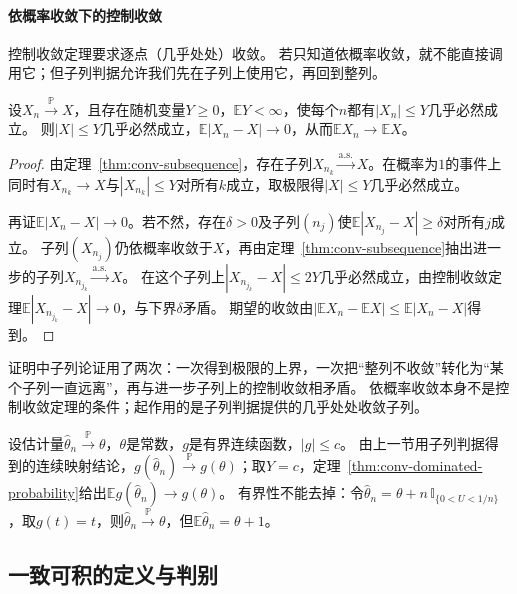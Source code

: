 \paragraph{依概率收敛下的控制收敛}
控制收敛定理要求逐点（几乎处处）收敛。
若只知道依概率收敛，就不能直接调用它；但子列判据允许我们先在子列上使用它，再回到整列。

\begin{theorem}[依概率收敛下的控制收敛]
\label{thm:conv-dominated-probability}
设$X_n\xrightarrow{\mathbb P}X$，且存在随机变量$Y\geq0$，$\mathbb EY<\infty$，使每个$n$都有$|X_n|\leq Y$几乎必然成立。
则$|X|\leq Y$几乎必然成立，$\mathbb E|X_n-X|\to0$，从而$\mathbb EX_n\to\mathbb EX$。
\end{theorem}

\begin{proof}
由定理~\ref{thm:conv-subsequence}，存在子列$X_{n_k}\xrightarrow{\mathrm{a.s.}}X$。在概率为$1$的事件上同时有$X_{n_k}\to X$与$|X_{n_k}|\leq Y$对所有$k$成立，取极限得$|X|\leq Y$几乎必然成立。

再证$\mathbb E|X_n-X|\to0$。若不然，存在$\delta>0$及子列$(n_j)$使$\mathbb E|X_{n_j}-X|\geq\delta$对所有$j$成立。
子列$(X_{n_j})$仍依概率收敛于$X$，再由定理~\ref{thm:conv-subsequence}抽出进一步的子列$X_{n_{j_k}}\xrightarrow{\mathrm{a.s.}}X$。
在这个子列上$|X_{n_{j_k}}-X|\leq2Y$几乎必然成立，由控制收敛定理$\mathbb E|X_{n_{j_k}}-X|\to0$，与下界$\delta$矛盾。
期望的收敛由$|\mathbb EX_n-\mathbb EX|\leq\mathbb E|X_n-X|$得到。
\end{proof}

证明中子列论证用了两次：一次得到极限的上界，一次把“整列不收敛”转化为“某个子列一直远离”，再与进一步子列上的控制收敛相矛盾。
依概率收敛本身不是控制收敛定理的条件；起作用的是子列判据提供的几乎处处收敛子列。

\begin{example}[有界函数的期望]
\label{ex:conv-bounded-function}
设估计量$\hat\theta_n\xrightarrow{\mathbb P}\theta$，$\theta$是常数，$g$是有界连续函数，$|g|\leq c$。
由上一节用子列判据得到的连续映射结论，$g(\hat\theta_n)\xrightarrow{\mathbb P}g(\theta)$；取$Y=c$，定理~\ref{thm:conv-dominated-probability}给出$\mathbb Eg(\hat\theta_n)\to g(\theta)$。
有界性不能去掉：令$\hat\theta_n=\theta+n\,\mathbb I_{\{0<U<1/n\}}$，取$g(t)=t$，则$\hat\theta_n\xrightarrow{\mathbb P}\theta$，但$\mathbb E\hat\theta_n=\theta+1$。
\end{example}

\subsection{一致可积的定义与判别}

